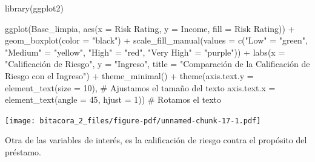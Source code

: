 \documentclass[
  letterpaper,
  DIV=11,
  numbers=noendperiod]{scrreprt}
\newenvironment{Shaded}{\begin{snugshade}}{\end{snugshade}}
\newcommand{\AttributeTok}[1]{\textcolor[rgb]{0.40,0.45,0.13}{#1}}
\newcommand{\CommentTok}[1]{\textcolor[rgb]{0.37,0.37,0.37}{#1}}
\newcommand{\DecValTok}[1]{\textcolor[rgb]{0.68,0.00,0.00}{#1}}
\newcommand{\FunctionTok}[1]{\textcolor[rgb]{0.28,0.35,0.67}{#1}}
\newcommand{\NormalTok}[1]{\textcolor[rgb]{0.00,0.23,0.31}{#1}}
\newcommand{\OtherTok}[1]{\textcolor[rgb]{0.00,0.23,0.31}{#1}}
\newcommand{\SpecialCharTok}[1]{\textcolor[rgb]{0.37,0.37,0.37}{#1}}
\newcommand{\StringTok}[1]{\textcolor[rgb]{0.13,0.47,0.30}{#1}}
\begin{document}
\begin{Shaded}
\begin{Highlighting}[]
\FunctionTok{library}\NormalTok{(ggplot2)}

\FunctionTok{ggplot}\NormalTok{(Base\_limpia, }\FunctionTok{aes}\NormalTok{(}\AttributeTok{x =} \StringTok{\textasciigrave{}}\AttributeTok{Risk Rating}\StringTok{\textasciigrave{}}\NormalTok{, }\AttributeTok{y =}\NormalTok{ Income, }\AttributeTok{fill =} \StringTok{\textasciigrave{}}\AttributeTok{Risk Rating}\StringTok{\textasciigrave{}}\NormalTok{)) }\SpecialCharTok{+}  
  \FunctionTok{geom\_boxplot}\NormalTok{(}\AttributeTok{color =} \StringTok{"black"}\NormalTok{) }\SpecialCharTok{+}  
  \FunctionTok{scale\_fill\_manual}\NormalTok{(}\AttributeTok{values =} \FunctionTok{c}\NormalTok{(}\StringTok{"Low"} \OtherTok{=} \StringTok{"green"}\NormalTok{, }\StringTok{"Medium"} \OtherTok{=} \StringTok{"yellow"}\NormalTok{, }\StringTok{"High"} \OtherTok{=} \StringTok{"red"}\NormalTok{, }\StringTok{"Very High"} \OtherTok{=} \StringTok{"purple"}\NormalTok{)) }\SpecialCharTok{+}  
  \FunctionTok{labs}\NormalTok{(}\AttributeTok{x =} \StringTok{"Calificación de Riesgo"}\NormalTok{, }\AttributeTok{y =} \StringTok{"Ingreso"}\NormalTok{, }\AttributeTok{title =} \StringTok{"Comparación de la Calificación de Riesgo con el Ingreso"}\NormalTok{) }\SpecialCharTok{+} 
  \FunctionTok{theme\_minimal}\NormalTok{() }\SpecialCharTok{+}
  \FunctionTok{theme}\NormalTok{(}\AttributeTok{axis.text.y =} \FunctionTok{element\_text}\NormalTok{(}\AttributeTok{size =} \DecValTok{10}\NormalTok{), }\CommentTok{\# Ajustamos el tamaño del texto}
        \AttributeTok{axis.text.x =} \FunctionTok{element\_text}\NormalTok{(}\AttributeTok{angle =} \DecValTok{45}\NormalTok{, }\AttributeTok{hjust =} \DecValTok{1}\NormalTok{))  }\CommentTok{\# Rotamos el texto}
\end{Highlighting}
\end{Shaded}

\texttt{[image: bitacora\_2\_files/figure-pdf/unnamed-chunk-17-1.pdf]}

Otra de las variables de interés, es la calificación de riesgo contra el
propósito del préstamo.
\end{document}
